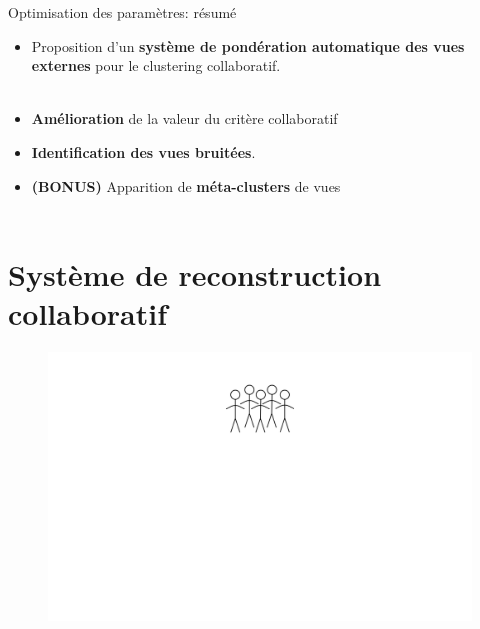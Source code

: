\documentclass[hyperref={pdfpagelabels=false}]{beamer}
\begin{document}
    \begin{frame}{Optimisation des paramètres: résumé}
        \begin{itemize}
            \item Proposition d'un \textbf{système de pondération automatique 
                des vues externes} pour le clustering collaboratif.\\~\\
            \item \textbf{Amélioration} de la valeur du critère collaboratif
            \item \textbf{Identification des vues bruitées}.
            \item \textbf{(BONUS)} Apparition de \textbf{méta-clusters} de 
                vues\\~\\
        \end{itemize}

        \begin{center}
            \fontsize{14pt}{15pt}
        \end{center}
    \end{frame}

    \section{Système de reconstruction collaboratif}
    \begin{frame}
        \begin{figure}[b]
            \centering
            \includegraphics[scale=.26]{idee_reconstruction_collaborative1}
        \end{figure}
    \end{frame}
\end{document}
